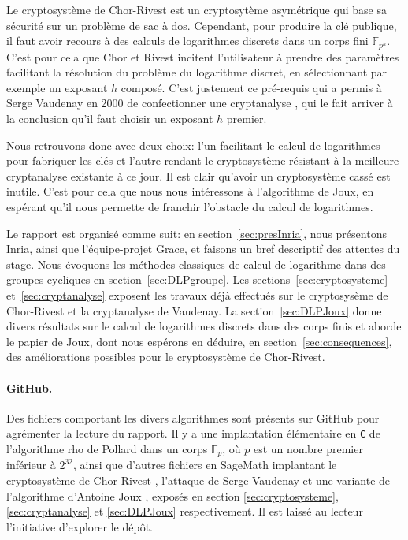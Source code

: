 \documentclass[a4paper, titlepage, 11pt]{article}
\theoremstyle{definition}
\theoremstyle{remark}
\def\gf #1{\mathbb{F}_{#1}}
\begin{document}
Le cryptosystème de Chor-Rivest est un cryptosytème asymétrique qui base sa sécurité sur un problème de sac à dos. Cependant, pour produire la clé publique, il faut avoir recours à des calculs de logarithmes discrets dans un corps fini $\gf{p^h}$. C'est pour cela que Chor et Rivest incitent l'utilisateur à prendre des paramètres facilitant la résolution du problème du logarithme discret, en sélectionnant par exemple un exposant $h$ composé. C'est justement ce pré-requis qui a permis à Serge Vaudenay en 2000 de confectionner une cryptanalyse \cite{vaudenay2000}, qui le fait arriver à la conclusion qu'il faut choisir un exposant $h$ premier.

Nous retrouvons donc avec deux choix: l'un facilitant le calcul de logarithmes pour fabriquer les clés et l'autre rendant le cryptosystème résistant à la meilleure cryptanalyse existante à ce jour. Il est clair qu'avoir un cryptosystème cassé est inutile. C'est pour cela que nous nous intéressons à l'algorithme de Joux, en espérant qu'il nous permette de franchir l’obstacle du calcul de logarithmes.

Le rapport est organisé comme suit: en section~\ref{sec:presInria}, nous présentons Inria, ainsi que l'équipe-projet Grace, et faisons un bref descriptif des attentes du stage. Nous évoquons les méthodes classiques de calcul de logarithme dans des groupes cycliques en section~\ref{sec:DLPgroupe}. Les sections~\ref{sec:cryptosysteme} et~\ref{sec:cryptanalyse} exposent les travaux déjà effectués sur le cryptosysème de Chor-Rivest et la cryptanalyse de Vaudenay. La section~\ref{sec:DLPJoux} donne divers résultats sur le calcul de logarithmes discrets dans des corps finis et aborde le papier de Joux, dont nous espérons en déduire, en section~\ref{sec:consequences}, des améliorations possibles pour le cryptosystème de Chor-Rivest.

\paragraph{GitHub.} Des fichiers comportant les divers algorithmes sont présents sur GitHub pour agrémenter la lecture du rapport. Il y a une implantation élémentaire en \verb|C| de l'algorithme rho de Pollard \cite{pollard1978} dans un corps $\gf{p}$, où $p$ est un nombre premier inférieur à $2^{32}$, ainsi que d'autres fichiers en SageMath implantant le cryptosystème de Chor-Rivest \cite{chorRivest1988}, l'attaque de Serge Vaudenay \cite{vaudenay2000} et une variante de l'algorithme d'Antoine Joux \cite{joux2013}, exposés en section \ref{sec:cryptosysteme}, \ref{sec:cryptanalyse} et \ref{sec:DLPJoux} respectivement. Il est laissé au lecteur l'initiative d'explorer le dépôt.
\end{document}
